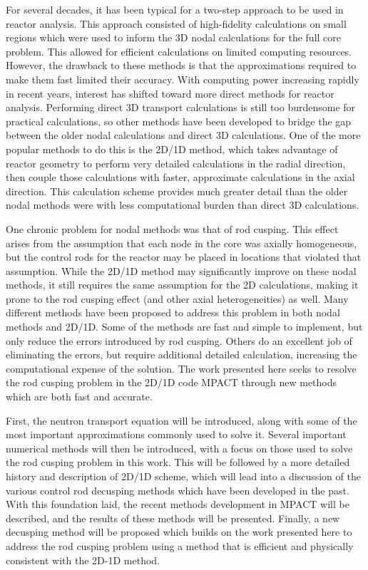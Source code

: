 For several decades, it has been typical for a two-step approach to be used in reactor analysis.  This approach consisted of high-fidelity calculations on small regions which were used to inform the 3D nodal calculations for the full core problem.  This allowed for efficient calculations on limited computing resources.  However, the drawback to these methods is that the approximations required to make them fast limited their accuracy.  With computing power increasing rapidly in recent years, interest has shifted toward more direct methods for reactor analysis.  Performing direct 3D transport calculations is still too burdensome for practical calculations, so other methods have been developed to bridge the gap between the older nodal calculations and direct 3D calculations.  One of the more popular methods to do this is the 2D/1D method, which takes advantage of reactor geometry to perform very detailed calculations in the radial direction, then couple those calculations with faster, approximate calculations in the axial direction.  This calculation scheme provides much greater detail than the older nodal methods were with less computational burden than direct 3D calculations.

One chronic problem for nodal methods was that of rod cusping.  This effect arises from the assumption that each node in the core was axially homogeneous, but the control rods for the reactor may be placed in locations that violated that assumption.  While the 2D/1D method may significantly improve on these nodal methods, it still requires the same assumption for the 2D calculations, making it prone to the rod cusping effect (and other axial heterogeneities) as well.  Many different methods have been proposed to address this problem in both nodal methods and 2D/1D.  Some of the methods are fast and simple to implement, but only reduce the errors introduced by rod cusping.  Others do an excellent job of eliminating the errors, but require additional detailed calculation, increasing the computational expense of the solution.  The work presented here seeks to resolve the rod cusping problem in the 2D/1D code MPACT through new methods which are both fast and accurate.

First, the neutron transport equation will be introduced, along with some of the most important approximations commonly used to solve it.  Several important numerical methods will then be introduced, with a focus on those used to solve the rod cusping problem in this work.  This will be followed by a more detailed history and description of 2D/1D scheme, which will lead into a discussion of the various control rod decusping methods which have been developed in the past.  With this foundation laid, the recent methods development in MPACT will be described, and the results of these methods will be presented.  Finally, a new decusping method will be proposed which builds on the work presented here to address the rod cusping problem using a method that is efficient and physically consistent with the 2D-1D method.